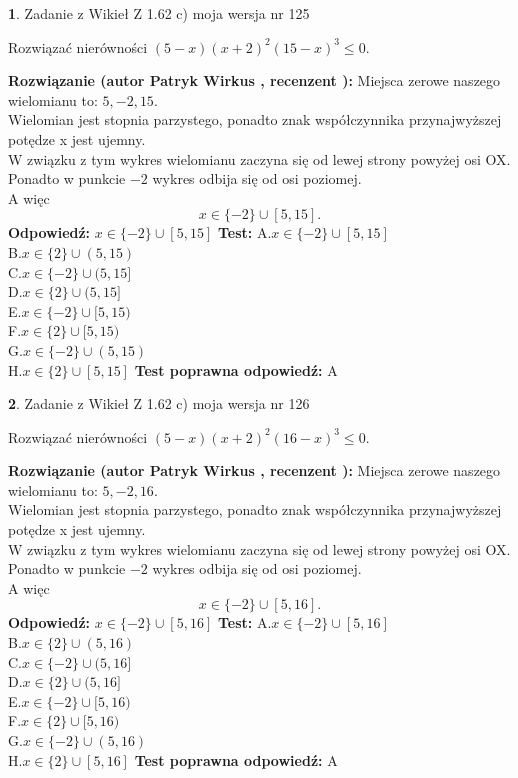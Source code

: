 \documentclass[12pt, a4paper]{article}
\theoremstyle{definition} %
\newtheorem{zad}{}
\newcommand{\zadStart}[1]{\begin{zad}#1\newline}
\newcommand{\zadStop}{\end{zad}}
\newcommand{\rozwStart}[2]{\noindent \textbf{Rozwiązanie (autor #1 , recenzent #2): }\newline}
\newcommand{\rozwStop}{\newline}
\newcommand{\odpStart}{\noindent \textbf{Odpowiedź:}\newline}
\newcommand{\odpStop}{\newline}
\newcommand{\testStart}{\noindent \textbf{Test:}\newline}
\newcommand{\testStop}{\newline}
\newcommand{\kluczStart}{\noindent \textbf{Test poprawna odpowiedź:}\newline}
\newcommand{\kluczStop}{\newline}
\begin{document}
\zadStart{Zadanie z Wikieł Z 1.62 c) moja wersja nr 125}

Rozwiązać nierówności $(5-x)(x+2)^{2}(15-x)^{3}\le0$.
\zadStop
\rozwStart{Patryk Wirkus}{}
Miejsca zerowe naszego wielomianu to: $5, -2, 15$.\\
Wielomian jest stopnia parzystego, ponadto znak współczynnika przy\linebreak najwyższej potędze x jest ujemny.\\ W związku z tym wykres wielomianu zaczyna się od lewej strony powyżej osi OX.\\
Ponadto w punkcie $-2$ wykres odbija się od osi poziomej.\\
A więc $$x \in \{-2\} \cup [5,15].$$
\rozwStop
\odpStart
$x \in \{-2\} \cup [5,15]$
\odpStop
\testStart
A.$x \in \{-2\} \cup [5,15]$\\
B.$x \in \{2\} \cup (5,15)$\\
C.$x \in \{-2\} \cup (5,15]$\\
D.$x \in \{2\} \cup (5,15]$\\
E.$x \in \{-2\} \cup [5,15)$\\
F.$x \in \{2\} \cup [5,15)$\\
G.$x \in \{-2\} \cup (5,15)$\\
H.$x \in \{2\} \cup [5,15]$
\testStop
\kluczStart
A
\kluczStop



\zadStart{Zadanie z Wikieł Z 1.62 c) moja wersja nr 126}

Rozwiązać nierówności $(5-x)(x+2)^{2}(16-x)^{3}\le0$.
\zadStop
\rozwStart{Patryk Wirkus}{}
Miejsca zerowe naszego wielomianu to: $5, -2, 16$.\\
Wielomian jest stopnia parzystego, ponadto znak współczynnika przy\linebreak najwyższej potędze x jest ujemny.\\ W związku z tym wykres wielomianu zaczyna się od lewej strony powyżej osi OX.\\
Ponadto w punkcie $-2$ wykres odbija się od osi poziomej.\\
A więc $$x \in \{-2\} \cup [5,16].$$
\rozwStop
\odpStart
$x \in \{-2\} \cup [5,16]$
\odpStop
\testStart
A.$x \in \{-2\} \cup [5,16]$\\
B.$x \in \{2\} \cup (5,16)$\\
C.$x \in \{-2\} \cup (5,16]$\\
D.$x \in \{2\} \cup (5,16]$\\
E.$x \in \{-2\} \cup [5,16)$\\
F.$x \in \{2\} \cup [5,16)$\\
G.$x \in \{-2\} \cup (5,16)$\\
H.$x \in \{2\} \cup [5,16]$
\testStop
\kluczStart
A
\kluczStop
\end{document}
